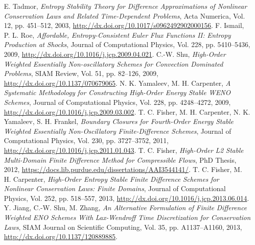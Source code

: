 \documentclass{scrartcl}
\begin{document}
\begin{thebibliography}{9}
    E. Tadmor,
    \textit{
        Entropy Stability Theory for Difference Approximations of Nonlinear
        Conservation Laws and Related Time-Dependent Problems},
    Acta Numerica, Vol. 12, pp. 451--512, 2003,
    \url{http://dx.doi.org/10.1017/s0962492902000156}.
    F. Ismail, P. L. Roe,
    \textit{
        Affordable, Entropy-Consistent {Euler} Flux Functions II: Entropy
        Production at Shocks},
    Journal of Computational Physics, Vol. 228, pp. 5410--5436, 2009,
    \url{http://dx.doi.org/10.1016/j.jcp.2009.04.021}.
    C.-W. Shu,
    \textit{
        High-Order Weighted Essentially Non-oscillatory Schemes for Convection
        Dominated Problems},
    {SIAM} Review, Vol. 51, pp. 82--126, 2009,
    \url{http://dx.doi.org/10.1137/070679065}.
    N. K. Yamaleev, M. H. Carpenter,
    \textit{A Systematic Methodology for Constructing High-Order Energy Stable {WENO} Schemes},
    Journal of Computational Physics, Vol. 228, pp. 4248--4272, 2009,
    \url{http://dx.doi.org/10.1016/j.jcp.2009.03.002}.
    T. C. Fisher, M. H. Carpenter, N. K. Yamaleev, S. H. Frankel,
    \textit{
        Boundary Closures for Fourth-Order Energy Stable Weighted Essentially
        Non-Oscillatory Finite-Difference Schemes},
    Journal of Computational Physics, Vol. 230, pp. 3727--3752, 2011,
    \url{http://dx.doi.org/10.1016/j.jcp.2011.01.043}.
    T. C. Fisher,
    \textit{
        High-Order L2 Stable Multi-Domain Finite Difference Method for
        Compressible Flows},
    PhD Thesis, 2012,
    \url{https://docs.lib.purdue.edu/dissertations/AAI3544141/}.
    T. C. Fisher, M. H. Carpenter,
    \textit{
        High-Order Entropy Stable Finite Difference Schemes for Nonlinear
        Conservation Laws: Finite Domains},
    Journal of Computational Physics, Vol. 252, pp. 518--557, 2013,
    \url{http://dx.doi.org/10.1016/j.jcp.2013.06.014}.
    Y. Jiang, C.-W. Shu, M. Zhang,
    \textit{
        An Alternative Formulation of Finite Difference Weighted ENO Schemes
        With Lax-Wendroff Time Discretization for Conservation Laws},
    {SIAM} Journal on Scientific Computing, Vol. 35, pp. A1137--A1160, 2013,
    \url{http://dx.doi.org/10.1137/120889885}.
\end{thebibliography}
\end{document}

